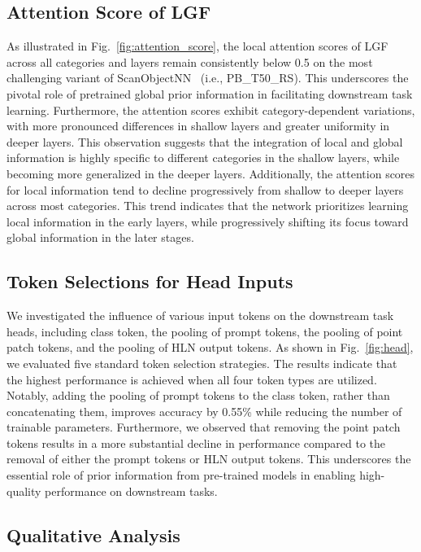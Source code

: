 \subsection{Attention Score of LGF}  
As illustrated in Fig.~\ref{fig:attention_score}, the local attention scores of LGF across all categories and layers remain consistently below 0.5 on the most challenging variant of ScanObjectNN~\cite{uy2019revisiting} (i.e., PB\_T50\_RS). This underscores the pivotal role of pretrained global prior information in facilitating downstream task learning. Furthermore, the attention scores exhibit category-dependent variations, with more pronounced differences in shallow layers and greater uniformity in deeper layers. This observation suggests that the integration of local and global information is highly specific to different categories in the shallow layers, while becoming more generalized in the deeper layers. Additionally, the attention scores for local information tend to decline progressively from shallow to deeper layers across most categories. This trend indicates that the network prioritizes learning local information in the early layers, while progressively shifting its focus toward global information in the later stages.

\subsection{Token Selections for Head Inputs}  
We investigated the influence of various input tokens on the downstream task heads, including class token, the pooling of prompt tokens, the pooling of point patch tokens, and the pooling of HLN output tokens. As shown in Fig.~\ref{fig:head}, we evaluated five standard token selection strategies. The results indicate that the highest performance is achieved when all four token types are utilized. Notably, adding the pooling of prompt tokens to the class token, rather than concatenating them, improves accuracy by 0.55\% while reducing the number of trainable parameters. Furthermore, we observed that removing the point patch tokens results in a more substantial decline in performance compared to the removal of either the prompt tokens or HLN output tokens. This underscores the essential role of prior information from pre-trained models in enabling high-quality performance on downstream tasks.

\subsection{Qualitative Analysis}

